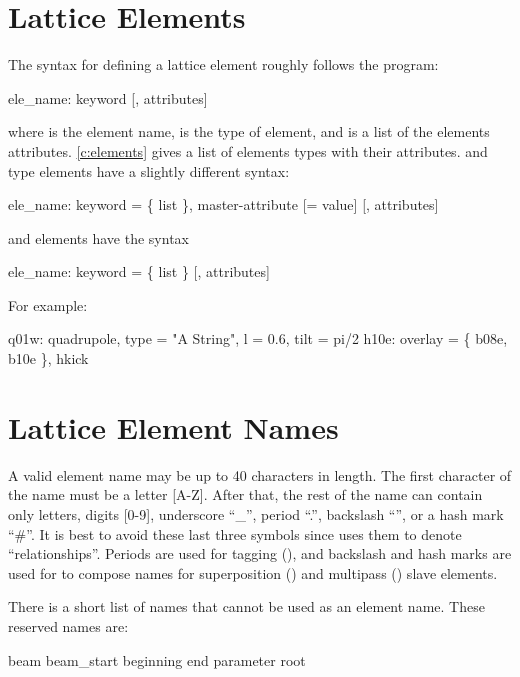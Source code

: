 \section{Lattice Elements}

The syntax for defining a lattice element roughly follows the
\mad\cite{b:maduser} program:
\begin{example}
  ele_name: keyword [, attributes]
\end{example}
where  is the element name,  is the type of
element, and  is a list of the elements
attributes. \cref{c:elements} gives a list of elements types with
their attributes.
 and  type elements have a slightly different syntax:
\begin{example}
  ele_name: keyword = \{ list \}, master-attribute [= value] [, attributes]
\end{example}
and  elements have the syntax
\begin{example}
  ele_name: keyword = \{ list \} [, attributes]
\end{example}  
For example:
\begin{example}
  q01w: quadrupole, type = "A String", l = 0.6, tilt = pi/2
  h10e: overlay = \{ b08e, b10e \}, hkick
\end{example}

\section{Lattice Element Names}
\label{s:ele.names}

A valid element name may be up to 40 characters in length. The first
character of the name must be a letter [A-Z]. After that, the rest of
the name can contain only letters, digits [0-9], underscore ``_'',
period ``.'', backslash ``\B'', or a hash mark ``\#''. It is best to
avoid these last three symbols since \bmad uses them to denote
``relationships''.  Periods are used for tagging (), and
backslash and hash marks are used for to compose names for
superposition () and multipass ()
slave elements.

There is a short list of names that cannot be used as an element name. 
These reserved names are:
\begin{example}
  beam
  beam_start
  beginning
  end
  parameter
  root
\end{example}


